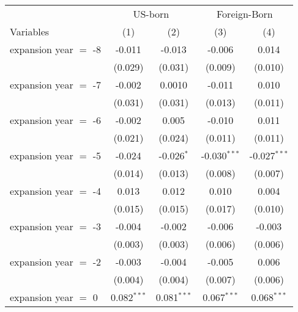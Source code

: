 \documentclass[
]{article}
\let\origtable\table
\let\endorigtable\endtable
\renewenvironment{table}[1][ht]{
      \expandafter\origtable\expandafter[H]
    }{
      \endorigtable
    }
\begin{document}
\begin{table}[htbp]
   \caption{The Impact of Medicaid Expansion on Medicaid Coverage }
   \centering
   \small
   \begin{adjustbox}{width = 0.6\textwidth, center}
      \renewcommand*{\arraystretch}{0.5}
      \begin{tabular}{lcccc}
         \tabularnewline \midrule \midrule
          & \multicolumn{2}{c}{US-born} & \multicolumn{2}{c}{Foreign-Born} \\ \cmidrule(lr){2-3} \cmidrule(lr){4-5}
         Variables             & (1)           & (2)           & (3)            & (4)\\  
         \midrule 
         expansion year $=$ -8 & -0.011        & -0.013        & -0.006         & 0.014\\   
                               & (0.029)       & (0.031)       & (0.009)        & (0.010)\\   
         expansion year $=$ -7 & -0.002        & 0.0010        & -0.011         & 0.010\\   
                               & (0.031)       & (0.031)       & (0.013)        & (0.011)\\   
         expansion year $=$ -6 & -0.002        & 0.005         & -0.010         & 0.011\\   
                               & (0.021)       & (0.024)       & (0.011)        & (0.011)\\   
         expansion year $=$ -5 & -0.024        & -0.026$^{*}$  & -0.030$^{***}$ & -0.027$^{***}$\\   
                               & (0.014)       & (0.013)       & (0.008)        & (0.007)\\   
         expansion year $=$ -4 & 0.013         & 0.012         & 0.010          & 0.004\\   
                               & (0.015)       & (0.015)       & (0.017)        & (0.010)\\   
         expansion year $=$ -3 & -0.004        & -0.002        & -0.006         & -0.003\\   
                               & (0.003)       & (0.003)       & (0.006)        & (0.006)\\   
         expansion year $=$ -2 & -0.003        & -0.004        & -0.005         & 0.006\\   
                               & (0.004)       & (0.004)       & (0.007)        & (0.006)\\   
         expansion year $=$ 0  & 0.082$^{***}$ & 0.081$^{***}$ & 0.067$^{***}$  & 0.068$^{***}$\\   

\end{tabular}
\end{adjustbox}
\end{table}
\end{document}
